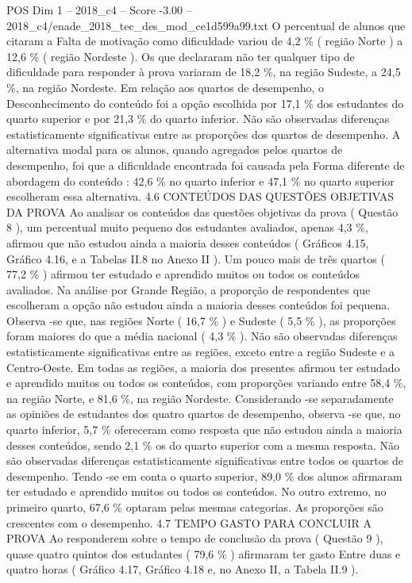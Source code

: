 \begin{textsample}{POS Dim 1 – 2018\_c4 – Score -3.00 – 2018\_c4/enade\_2018\_tec\_des\_mod\_ce1d599a99.txt}
O percentual de alunos que citaram a Falta de motivação como dificuldade variou de 4,2 \% ( região Norte ) a 12,6 \% ( região Nordeste ).
Os que declararam não ter qualquer tipo de dificuldade para responder à prova variaram de 18,2 \%, na região Sudeste, a 24,5 \%, na região Nordeste.
Em relação aos quartos de desempenho, o Desconhecimento do conteúdo foi a opção escolhida por 17,1 \% dos estudantes do quarto superior e por 21,3 \% do quarto inferior.
Não são observadas diferenças estatisticamente significativas entre as proporções dos quartos de desempenho.
A alternativa modal para os alunos, quando agregados pelos quartos de desempenho, foi que a dificuldade encontrada foi causada pela Forma diferente de abordagem do conteúdo : 42,6 \% no quarto inferior e 47,1 \% no quarto superior escolheram essa alternativa. 4.6 CONTEÚDOS DAS QUESTÕES OBJETIVAS DA PROVA Ao analisar os conteúdos das questões objetivas da prova ( Questão 8 ), um percentual muito pequeno dos estudantes avaliados, apenas 4,3 \%, afirmou que não estudou ainda a maioria desses conteúdos ( Gráficos 4.15, Gráfico 4.16, e a Tabelas II.8 no Anexo II ).
Um pouco mais de três quartos ( 77,2 \% ) afirmou ter estudado e aprendido muitos ou todos os conteúdos avaliados.
Na análise por Grande Região, a proporção de respondentes que escolheram a opção não estudou ainda a maioria desses conteúdos foi pequena.
Observa -se que, nas regiões Norte ( 16,7 \% ) e Sudeste ( 5,5 \% ), as proporções foram maiores do que a média nacional ( 4,3 \% ).
Não são observadas diferenças estatisticamente significativas entre as regiões, exceto entre a região Sudeste e a Centro-Oeste.
Em todas as regiões, a maioria dos presentes afirmou ter estudado e aprendido muitos ou todos os conteúdos, com proporções variando entre 58,4 \%, na região Norte, e 81,6 \%, na região Nordeste.
Considerando -se separadamente as opiniões de estudantes dos quatro quartos de desempenho, observa -se que, no quarto inferior, 5,7 \% ofereceram como resposta que não estudou ainda a maioria desses conteúdos, sendo 2,1 \% os do quarto superior com a mesma resposta.
Não são observadas diferenças estatisticamente significativas entre todos os quartos de desempenho.
Tendo -se em conta o quarto superior, 89,0 \% dos alunos afirmaram ter estudado e aprendido muitos ou todos os conteúdos.
No outro extremo, no primeiro quarto, 67,6 \% optaram pelas mesmas categorias.
As proporções são crescentes com o desempenho. 4.7 TEMPO GASTO PARA CONCLUIR A PROVA Ao responderem sobre o tempo de conclusão da prova ( Questão 9 ), quase quatro quintos dos estudantes ( 79,6 \% ) afirmaram ter gasto Entre duas e quatro horas ( Gráfico 4.17, Gráfico 4.18 e, no Anexo II, a Tabela II.9 ).

\end{textsample}
